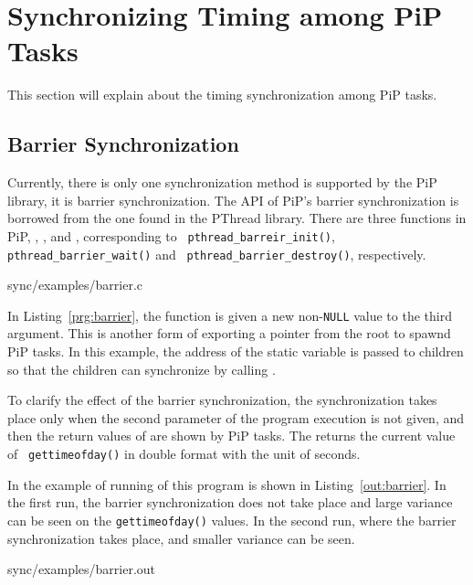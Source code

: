 
\section{Synchronizing Timing among PiP Tasks}

This section will explain about the timing synchronization among PiP
tasks.

\subsection{Barrier Synchronization}

Currently, there is only one synchronization method is supported by
the PiP library, it is barrier synchronization. The API of PiP's
barrier synchronization is borrowed from the one found in the PThread
library. There are three functions in PiP,
, , and
  , corresponding to {\tt
    pthread_barreir_init()}, {\tt pthread_barrier_wait()} and {\tt
        pthread_barrier_destroy()}, respectively. 

 {sync/examples/barrier.c}

In Listing~\ref{prg:barrier}, the  function is
given a new non-{\tt NULL} value to the third argument. This is
another form of exporting a pointer from the root to spawnd PiP
tasks. In this example, the address of the 
static variable is passed to children so that the children can
synchronize by calling .

To clarify the effect of the barrier synchronization, the
synchronization takes place only when the second parameter of the
program execution is not given, and then the return values of
 are shown by PiP tasks. The
 returns the current value of {\tt
  gettimeofday()} in double format with the unit of seconds.

In the example of running of this program is shown in
Listing~\ref{out:barrier}. In the first run, the barrier
synchronization does not take place and large variance can be seen on
the {\tt gettimeofday()} values. In the second run, where the barrier
synchronization takes place, and smaller variance can be seen.

 {sync/examples/barrier.out}
